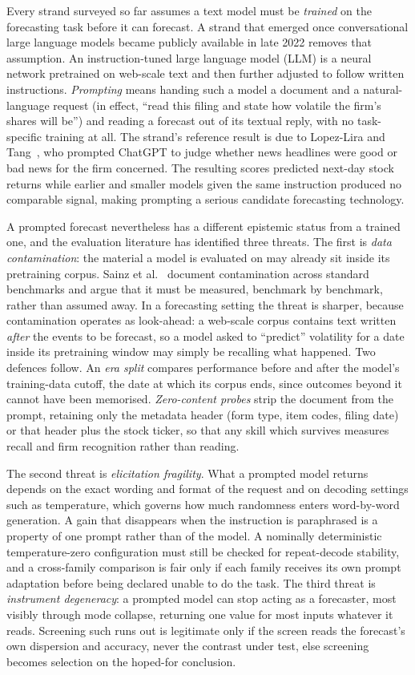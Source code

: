 Every strand surveyed so far assumes a text model must be \emph{trained} on the forecasting task before it can forecast. A strand that emerged once conversational large language models became publicly available in late 2022 removes that assumption. An instruction-tuned large language model (LLM) is a neural network pretrained on web-scale text and then further adjusted to follow written instructions. \emph{Prompting} means handing such a model a document and a natural-language request (in effect, ``read this filing and state how volatile the firm's shares will be'') and reading a forecast out of its textual reply, with no task-specific training at all. The strand's reference result is due to Lopez-Lira and Tang~\cite{lopezlira2023chatgpt}, who prompted ChatGPT to judge whether news headlines were good or bad news for the firm concerned. The resulting scores predicted next-day stock returns while earlier and smaller models given the same instruction produced no comparable signal, making prompting a serious candidate forecasting technology.

A prompted forecast nevertheless has a different epistemic status from a trained one, and the evaluation literature has identified three threats. The first is \emph{data contamination}: the material a model is evaluated on may already sit inside its pretraining corpus. Sainz et al.~\cite{sainz2023contamination} document contamination across standard benchmarks and argue that it must be measured, benchmark by benchmark, rather than assumed away. In a forecasting setting the threat is sharper, because contamination operates as look-ahead: a web-scale corpus contains text written \emph{after} the events to be forecast, so a model asked to ``predict'' volatility for a date inside its pretraining window may simply be recalling what happened. Two defences follow. An \emph{era split} compares performance before and after the model's training-data cutoff, the date at which its corpus ends, since outcomes beyond it cannot have been memorised. \emph{Zero-content probes} strip the document from the prompt, retaining only the metadata header (form type, item codes, filing date) or that header plus the stock ticker, so that any skill which survives measures recall and firm recognition rather than reading.

The second threat is \emph{elicitation fragility}. What a prompted model returns depends on the exact wording and format of the request and on decoding settings such as temperature, which governs how much randomness enters word-by-word generation. A gain that disappears when the instruction is paraphrased is a property of one prompt rather than of the model. A nominally deterministic temperature-zero configuration must still be checked for repeat-decode stability, and a cross-family comparison is fair only if each family receives its own prompt adaptation before being declared unable to do the task. The third threat is \emph{instrument degeneracy}: a prompted model can stop acting as a forecaster, most visibly through mode collapse, returning one value for most inputs whatever it reads. Screening such runs out is legitimate only if the screen reads the forecast's own dispersion and accuracy, never the contrast under test, else screening becomes selection on the hoped-for conclusion.

